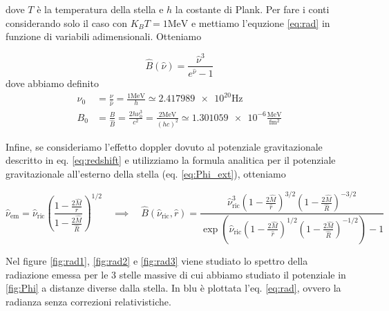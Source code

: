 \documentclass[a4paper, titlepage]{article}
\begin{document}
dove $T$ è la temperatura della stella e $h$ la costante di Plank.
Per fare i conti considerando solo il caso con $K_B T = 1
\unit{\mega\electronvolt}$ e mettiamo l'equzione \ref{eq:rad} in funzione di
variabili adimensionali. Otteniamo

\begin{equation}
    \hat B(\hat \nu) = \frac{\hat \nu ^3 }{e^{\hat \nu} - 1}
    \label{eq:B_ad}
\end{equation}
dove abbiamo definito
\begin{align}
    \nu_0 &= \frac{\nu}{\hat \nu} = \frac{1\unit{\mega\electronvolt}}{h} \simeq
    \num{2.417989e20} \unit{\hertz} \label{eq:B0def}\\
    B_0 &= \frac{B}{\hat B} = \frac{2 h \nu_0^3}{c^2}
    = \frac{2 \unit{\mega\electronvolt}}{(h c)^2} \simeq \num{1.301059e-6}
    \frac{\unit{\mega\electronvolt}}{\unit{\femto\meter\squared}}
    \label{eq:nu0def}
\end{align}

Infine, se consideriamo l'effetto doppler dovuto al potenziale gravitazionale
descritto in eq. \ref{eq:redshift} e utilizziamo la formula analitica per il
potenziale gravitazionale all'esterno della stella (eq. \ref{eq:Phi_ext}),
otteniamo

\begin{equation}
    \hat \nu_\text{em} = \hat \nu_\text{ric}
    \left ( \frac{1 - \frac{2 \hat M}{r}}{1 - \frac{2 \hat M}{\hat R}}\right )^{1/2}
    \quad
    \implies
    \quad
    \hat B(\hat \nu_\text{ric}, \hat r) =
    \frac{\hat \nu_\text{ric}^3 \left(1 - \frac{2 \hat M}{\hat r}\right)^{3/2}
    \left(1 - \frac{2 \hat M}{\hat R}\right)^{-3/2} }
    {\exp( \hat \nu_\text{ric} \left(1 - \frac{2 \hat M}{\hat r} \right)^{1/2}
    \left(1 - \frac{2 \hat M}{\hat R}\right)^{-1/2} ) - 1}
    \label{eq:B_corr}
\end{equation}

Nel figure \ref{fig:rad1}, \ref{fig:rad2} e \ref{fig:rad3} viene studiato lo
spettro della radiazione emessa per le 3 stelle massive di cui abbiamo studiato
il potenziale in \ref{fig:Phi} a distanze diverse dalla stella.
In blu è plottata l'eq. \ref{eq:rad}, ovvero la radianza senza correzioni
relativistiche.
\end{document}
